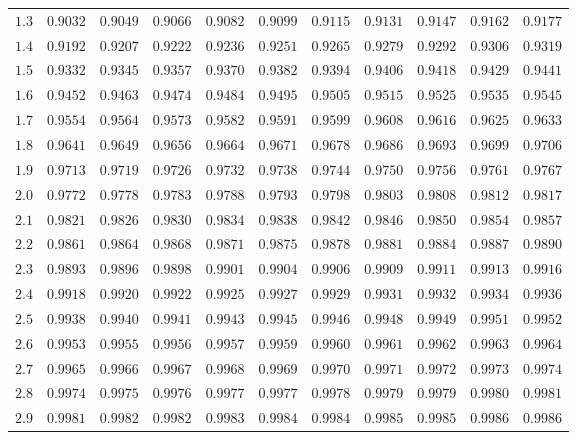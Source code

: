 \begin{center}
\begin{tabular}{| c | c | c | c | c | c | c | c | c | c | c |}
	$1.3$ & $0.9032$ & $0.9049$ & $0.9066$ & $0.9082$ & $0.9099$ & $0.9115$ & $0.9131$ & $0.9147$ & $0.9162$ & $0.9177$ \\
	$1.4$ & $0.9192$ & $0.9207$ & $0.9222$ & $0.9236$ & $0.9251$ & $0.9265$ & $0.9279$ & $0.9292$ & $0.9306$ & $0.9319$ \\
	$1.5$ & $0.9332$ & $0.9345$ & $0.9357$ & $0.9370$ & $0.9382$ & $0.9394$ & $0.9406$ & $0.9418$ & $0.9429$ & $0.9441$ \\
	$1.6$ & $0.9452$ & $0.9463$ & $0.9474$ & $0.9484$ & $0.9495$ & $0.9505$ & $0.9515$ & $0.9525$ & $0.9535$ & $0.9545$ \\
	$1.7$ & $0.9554$ & $0.9564$ & $0.9573$ & $0.9582$ & $0.9591$ & $0.9599$ & $0.9608$ & $0.9616$ & $0.9625$ & $0.9633$ \\
	$1.8$ & $0.9641$ & $0.9649$ & $0.9656$ & $0.9664$ & $0.9671$ & $0.9678$ & $0.9686$ & $0.9693$ & $0.9699$ & $0.9706$ \\
	$1.9$ & $0.9713$ & $0.9719$ & $0.9726$ & $0.9732$ & $0.9738$ & $0.9744$ & $0.9750$ & $0.9756$ & $0.9761$ & $0.9767$ \\
	\hline
	$2.0$ & $0.9772$ & $0.9778$ & $0.9783$ & $0.9788$ & $0.9793$ & $0.9798$ & $0.9803$ & $0.9808$ & $0.9812$ & $0.9817$ \\
	$2.1$ & $0.9821$ & $0.9826$ & $0.9830$ & $0.9834$ & $0.9838$ & $0.9842$ & $0.9846$ & $0.9850$ & $0.9854$ & $0.9857$ \\
	$2.2$ & $0.9861$ & $0.9864$ & $0.9868$ & $0.9871$ & $0.9875$ & $0.9878$ & $0.9881$ & $0.9884$ & $0.9887$ & $0.9890$ \\
	$2.3$ & $0.9893$ & $0.9896$ & $0.9898$ & $0.9901$ & $0.9904$ & $0.9906$ & $0.9909$ & $0.9911$ & $0.9913$ & $0.9916$ \\
	$2.4$ & $0.9918$ & $0.9920$ & $0.9922$ & $0.9925$ & $0.9927$ & $0.9929$ & $0.9931$ & $0.9932$ & $0.9934$ & $0.9936$ \\
	$2.5$ & $0.9938$ & $0.9940$ & $0.9941$ & $0.9943$ & $0.9945$ & $0.9946$ & $0.9948$ & $0.9949$ & $0.9951$ & $0.9952$ \\
	$2.6$ & $0.9953$ & $0.9955$ & $0.9956$ & $0.9957$ & $0.9959$ & $0.9960$ & $0.9961$ & $0.9962$ & $0.9963$ & $0.9964$ \\
	$2.7$ & $0.9965$ & $0.9966$ & $0.9967$ & $0.9968$ & $0.9969$ & $0.9970$ & $0.9971$ & $0.9972$ & $0.9973$ & $0.9974$ \\
	$2.8$ & $0.9974$ & $0.9975$ & $0.9976$ & $0.9977$ & $0.9977$ & $0.9978$ & $0.9979$ & $0.9979$ & $0.9980$ & $0.9981$ \\
	$2.9$ & $0.9981$ & $0.9982$ & $0.9982$ & $0.9983$ & $0.9984$ & $0.9984$ & $0.9985$ & $0.9985$ & $0.9986$ & $0.9986$ \\

\end{tabular}
\end{center}
